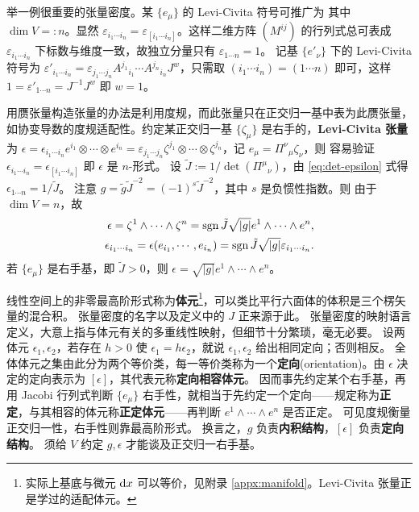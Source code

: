 举一例很重要的张量密度。某 $\{e_\mu\}$ 的 Levi-Civita 符号可推广为
其中 $\dim V=:n$。显然 $\varepsilon_{i_1\cdots i_n}=\varepsilon_{[i_1\cdots i_n]}$。这样二维方阵 $(M^{ij})$ 的行列式总可表成
$\varepsilon_{i_1\cdots i_n}$ 下标数与维度一致，故独立分量只有 $\varepsilon_{1\cdots n}=1$。
记基 $\{e'_\nu\}$ 下的 Levi-Civita 符号为 $\varepsilon'_{i_1\cdots i_n}=\varepsilon_{j_1\cdots j_n} A^{j_1}{}_{i_1} \cdots A^{j_n}{}_{i_n} J^w$，只需取 $(i_1\cdots i_n)=(1\cdots n)$ 即可，这样 $1=\varepsilon'_{1\cdots n}=J^{-1} J^w$ 即 $w=1$。

用赝张量构造张量的办法是利用度规，而此张量只在正交归一基中表为此赝张量，如协变导数的度规适配性。约定某正交归一基 $\{\zeta_\mu\}$ 是右手的，\textbf{Levi-Civita 张量}为 $\epsilon=\epsilon_{i_1\cdots i_n} e^{i_1}\otimes\cdots\otimes e^{i_n}=\varepsilon_{j_1\cdots j_n} \zeta^{j_1}\otimes\cdots\otimes \zeta^{j_n}$，记 $e_\mu=\Pi^\nu{ }_\mu \zeta_\nu$，则
容易验证 $\epsilon_{i_1\cdots i_n}=\epsilon_{[i_1\cdots i_n]}$ 即 $\epsilon$ 是 $n$-形式。
设 $\tilde J:=1/\det(\Pi^\mu{}_\nu)$，由 \eqref{eq:det-epsilon} 式得 $\epsilon_{1\cdots n}=1/\tilde J$。
注意 $g=\tilde g\tilde J^{-2}=(-1)^s\tilde J^{-2}$，其中 $s$ 是负惯性指数。则
由于 $\dim V=n$，故
\begin{align}
    \epsilon=\zeta^{1}\wedge\cdots\wedge \zeta^{n}=\operatorname{sgn}\tilde J\sqrt{|g|}e^{1}\wedge\cdots\wedge e^{n},\\
    \epsilon_{i_1\cdots i_n}=\epsilon(e_{i_1},\cdots,e_{i_n})=\operatorname{sgn}\tilde J\sqrt{|g|}\varepsilon_{i_1\cdots i_n}.
\end{align}
若 $\{e_\mu\}$ 是右手基，即 $\tilde J>0$，则 $\epsilon=\sqrt{|g|}e^{1}\wedge\cdots\wedge e^{n}$。

线性空间上的非零最高阶形式称为\textbf{体元}\footnote{实际上基底与微元 $\dd x$ 可以等价，见附录 \ref{appx:manifold}。Levi-Civita 张量正是学过的适配体元。}，可以类比平行六面体的体积是三个楞矢量的混合积。
张量密度的名字以及定义中的 $J$ 正来源于此。
张量密度的映射语言定义，大意上指与体元有关的多重线性映射，但细节十分繁琐，毫无必要。
设两体元 $\epsilon_1,\epsilon_2$，若存在 $h>0$ 使 $\epsilon_1=h\epsilon_2$，就说 $\epsilon_1,\epsilon_2$ 给出相同定向；否则相反。
全体体元之集由此分为两个等价类，每一等价类称为一个\textbf{定向}(orientation)。由 $\epsilon$ 决定的定向表示为 $[\epsilon]$，其代表元称\textbf{定向相容体元}。
因而事先约定某个右手基，再用 Jacobi 行列式判断 $\{e_\mu\}$ 右手性，就相当于先约定一个定向——规定称为\textbf{正定}，与其相容的体元称\textbf{正定体元}——再判断 $e^{1}\wedge\cdots\wedge e^{n}$ 是否正定。
可见度规衡量正交归一性，右手性则靠最高阶形式。
换言之，$g$ 负责\textbf{内积结构}，$[\epsilon]$ 负责\textbf{定向结构}。
须给 $V$ 约定 $g,\epsilon$ 才能谈及正交归一右手基。

